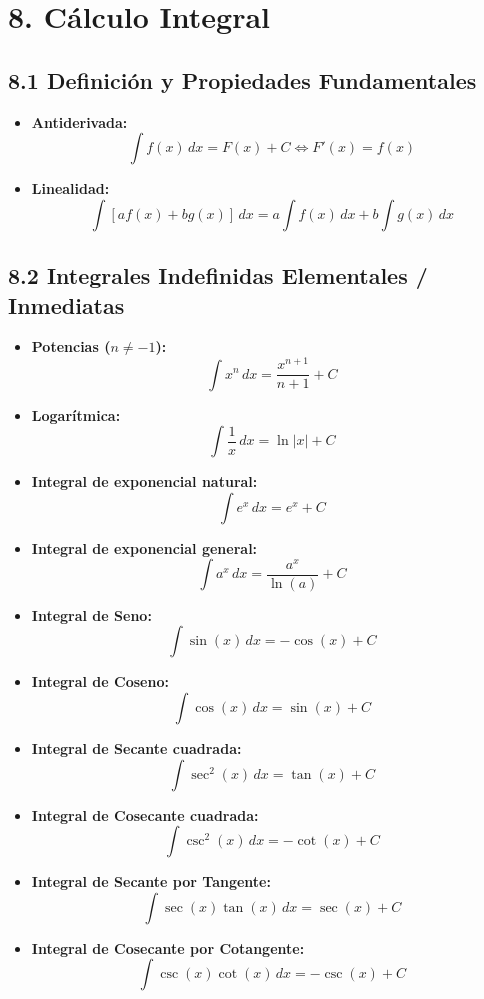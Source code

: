 \documentclass[11pt,a4paper]{article}
\begin{document}
\section*{8. Cálculo Integral}

\subsection*{8.1 Definición y Propiedades Fundamentales}

\begin{itemize}
  \item \textbf{Antiderivada:}
  \[
    \int f(x) \, dx = F(x) + C \iff F'(x) = f(x)
  \]
  \item \textbf{Linealidad:}
  \[
    \int [a f(x) + b g(x)] \, dx = a \int f(x) \, dx + b \int g(x) \, dx
  \]
\end{itemize}

\subsection*{8.2 Integrales Indefinidas Elementales / Inmediatas}

\begin{itemize}
  \item \textbf{Potencias ($n \ne -1$):}
  \[
    \int x^n \, dx = \frac{x^{n+1}}{n+1} + C
  \]
  \item \textbf{Logarítmica:}
  \[
    \int \frac{1}{x} \, dx = \ln|x| + C
  \]
  \item \textbf{Integral de exponencial natural:}
  \[
    \int e^x \, dx = e^x + C
  \]
  \item \textbf{Integral de exponencial general:}
  \[
    \int a^x \, dx = \frac{a^x}{\ln(a)} + C
  \]
  \item \textbf{Integral de Seno:}
  \[
    \int \sin(x) \, dx = -\cos(x) + C
  \]
  \item \textbf{Integral de Coseno:}
  \[
    \int \cos(x) \, dx = \sin(x) + C
  \]
  \item \textbf{Integral de Secante cuadrada:}
  \[
    \int \sec^2(x) \, dx = \tan(x) + C
  \]
  \item \textbf{Integral de Cosecante cuadrada:}
  \[
    \int \csc^2(x) \, dx = -\cot(x) + C
  \]
  \item \textbf{Integral de Secante por Tangente:}
  \[
    \int \sec(x)\tan(x) \, dx = \sec(x) + C
  \]
  \item \textbf{Integral de Cosecante por Cotangente:}
  \[
    \int \csc(x)\cot(x) \, dx = -\csc(x) + C
  \]
\end{itemize}
\end{document}
